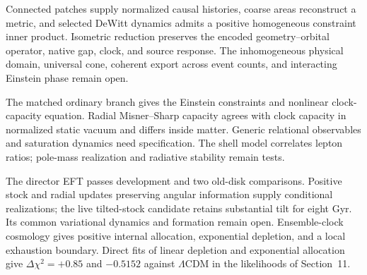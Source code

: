 \documentclass[11pt]{article}
\begin{document}
Connected patches supply normalized causal histories, coarse areas reconstruct a metric, and selected DeWitt dynamics admits a positive homogeneous constraint inner product. Isometric reduction preserves the encoded geometry--orbital operator, native gap, clock, and source response. The inhomogeneous physical domain, universal cone, coherent export across event counts, and interacting Einstein phase remain open.

The matched ordinary branch gives the Einstein constraints and nonlinear clock-capacity equation. Radial Misner--Sharp capacity agrees with clock capacity in normalized static vacuum and differs inside matter. Generic relational observables and saturation dynamics need specification. The shell model correlates lepton ratios; pole-mass realization and radiative stability remain tests.

The director EFT passes development and two old-disk comparisons. Positive stock and radial updates preserving angular information supply conditional realizations; the live tilted-stock candidate retains substantial tilt for eight Gyr. Its common variational dynamics and formation remain open. Ensemble-clock cosmology gives positive internal allocation, exponential depletion, and a local exhaustion boundary. Direct fits of linear depletion and exponential allocation give $\Delta\chi^2=+0.85$ and $-0.5152$ against $\Lambda$CDM in the likelihoods of Section~11.
\end{document}
